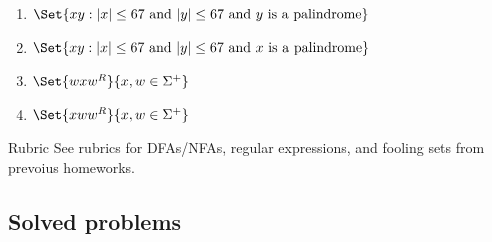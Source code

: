 \documentclass[11pt]{article}
\begin{document}
\begin{enumerate}
\begin{enumerate}
\item
$\Set{xy : |x| \leq 67 \text{ and } |y| \leq 67 \text{ and } y \text{ is a palindrome}}$

\item
$\Set{xy : |x| \leq 67 \text{ and } |y| \leq 67 \text{ and } x \text{ is a palindrome}}$

\item
$\Set{wxw^R}{x, w\in \Sigma^+}$

\item
$\Set{xww^R}{x, w\in \Sigma^+}$

\end{enumerate}
\begin{Rubric}{Rubric}
    See rubrics for DFAs/NFAs, regular expressions, and fooling sets from prevoius homeworks.
\end{Rubric}

\end{enumerate}
\newpage

\subsection*{Solved problems}
\end{document}
